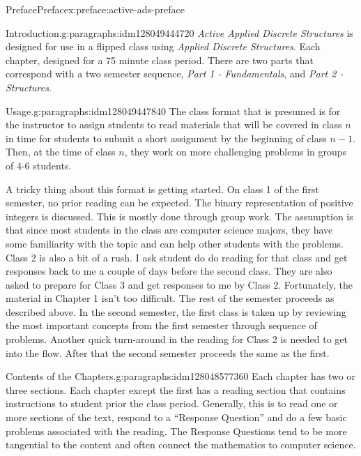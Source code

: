 \documentclass[oneside,10pt,]{book}
\numberwithin{equation}{section}
\begin{document}
\begin{preface}{Preface}{}{Preface}{}{}{x:preface:active-ads-preface}
\begin{paragraphs}{Introduction.}{g:paragraphs:idm128049444720}%
\emph{Active Applied Discrete Structures} is designed for use in a flipped class using \emph{Applied Discrete Structures}. Each chapter, designed for a 75 minute class period.  There are two parts that correspond with a two semester sequence, \emph{Part 1 - Fundamentals}, and \emph{Part 2 - Structures}.%
\end{paragraphs}%
\begin{paragraphs}{Usage.}{g:paragraphs:idm128049447840}%
The class format that is presumed is for the instructor to assign students to read materials that will be covered in class \(n\) in time for students to submit a short assignment by the beginning of class \(n-1\). Then, at the time of class \(n\), they work on more challenging problems in groups of 4-6 students.%
\par
A tricky thing about this format is getting started. On class 1 of the first semester, no prior reading can be expected. The binary representation of positive integers is discussed. This is mostly done through group work. The assumption is that since most students in the class are computer science majors, they have some familiarity with the topic and can help  other students with the problems. Class 2 is also a bit of a rush. I ask student do do reading for that class and get responses back to me a couple of days before the second class. They are also asked to prepare for Class 3 and get responses to me by Class 2.   Fortunately, the material in Chapter 1 isn't too difficult.  The rest of the semester proceeds as described above. In the second semester, the first class is taken up by reviewing the most important concepts from the first semester through sequence of problems. Another quick turn-around in the reading for Class 2 is needed to get into the flow.  After that the second semester proceeds the same as the first.%
\end{paragraphs}%
\begin{paragraphs}{Contents of the Chapters.}{g:paragraphs:idm128048577360}%
Each chapter has two or three sections.  Each chapter except the first has a reading section that contains instructions to student prior the class period. Generally, this is to read one or more sections of the text, respond to a ``Response Question'' and do a few basic problems associated with the reading.  The Response Questions tend to be more tangential to the content and often connect the mathematics to computer science.%

\end{paragraphs}
\end{preface}
\end{document}
